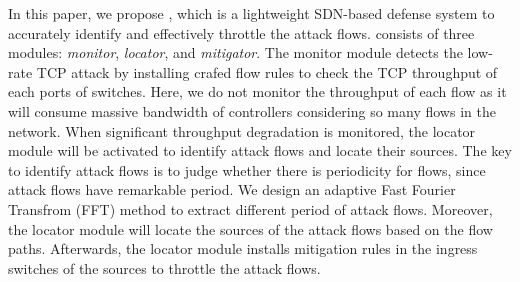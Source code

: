 In this paper, we propose \TheName{}, which is a lightweight SDN-based defense system to accurately identify and effectively throttle the attack flows.  \TheName{} consists of three modules: \emph{monitor}, \emph{locator}, and \emph{mitigator}. The monitor module detects the low-rate TCP attack by installing crafed flow rules to check the TCP throughput of each ports of switches. Here, we do not monitor the throughput of each flow as it will consume massive bandwidth of controllers considering so many flows in the network. When significant throughput degradation is monitored, the locator module will be activated to identify attack flows and locate their sources. The key to identify attack flows is to judge whether there is periodicity for flows, since attack flows have remarkable period. We design an adaptive Fast Fourier Transfrom (FFT) method to extract different period of attack flows. Moreover, the locator module will locate the sources of the attack flows based on the flow paths. Afterwards, the locator module installs mitigation rules in the ingress switches of the sources to throttle the attack flows. 


